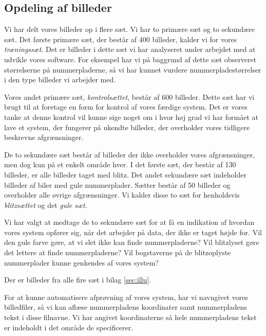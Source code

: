 \subsection{Opdeling af billeder}
Vi har delt vores billeder op i flere sæt. Vi har to primære sæt og to sekundære sæt. Det første primære sæt, der består af 400 billeder, kalder vi for vores \textit{træningssæt}. Det er billeder i dette sæt vi har analyseret under arbejdet med at udvikle vores software. For eksempel har vi på baggrund af dette sæt observeret størrelserne på nummerpladerne, så vi har kunnet vurdere nummerpladestørrelser i den type billeder vi arbejder med.

Vores andet primære sæt, \textit{kontrolsættet}, består af 600 billeder. Dette sæt har vi brugt til at foretage en form for kontrol af vores færdige system. Det er vores tanke at denne kontrol vil kunne sige noget om i hvor høj grad vi har formået at lave et system, der fungerer på ukendte billeder, der overholder vores tidligere beskrevne afgrænsninger. 

De to sekundære sæt består af billeder der ikke overholder vores afgrænsninger, men dog kun på et enkelt område hver. I det første sæt, der består af 130 billeder, er alle billeder taget med blitz. Det andet sekundære sæt indeholder billeder af biler med gule nummerplader. Sætter består af 50 billeder og overholder alle øvrige afgrænsninger. Vi kalder disse to sæt for henholdsvis \textit{blitzsættet} og det \textit{gule sæt}.

Vi har valgt at medtage de to sekundære sæt for at få en indikation af hvordan vores system opfører sig, når det arbejder på data, der ikke er taget højde for. Vil den gule farve gøre, at vi slet ikke kan finde nummerpladerne? Vil blitzlyset gøre det lettere at finde nummerpladerne? Vil bogstaverne på de blitzoplyste nummerplader kunne genkendes af vores system?

Der er billeder fra alle fire sæt i bilag \vref{sec:illu}.

For at kunne automatisere afprøvning af vores system, har vi navngivet vores billedfiler, så vi kan aflæse nummerpladens koordinater samt nummerpladens tekst i disse filnavne. Vi har angivet koordinaterne så hele nummerpladens tekst er indeholdt i det område de specificerer.